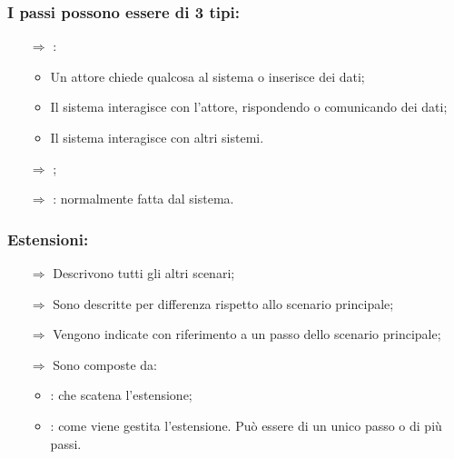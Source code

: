 \subsubsection{I passi possono essere di 3 tipi:}

\begin{itemize}
    \item [$\Rightarrow$] : 
    \begin{itemize}
        \item Un attore chiede qualcosa al sistema o inserisce dei dati;
        \item Il sistema interagisce con l'attore, rispondendo o comunicando dei dati;
        \item Il sistema interagisce con altri sistemi.
    \end{itemize}
    \item [$\Rightarrow$] ;
    \item [$\Rightarrow$] : normalmente fatta dal sistema.
\end{itemize}


\subsubsection{Estensioni:}

\begin{itemize}
    \item [$\Rightarrow$] Descrivono tutti gli altri scenari;
    \item [$\Rightarrow$] Sono descritte per differenza rispetto allo scenario principale;
    \item [$\Rightarrow$] Vengono indicate con riferimento a un passo dello scenario principale;
    \item [$\Rightarrow$] Sono composte da:
    \begin{itemize}
        \item {}: che scatena l'estensione;
        \item {}: come viene gestita l'estensione. Può essere di un unico passo o di più passi.
    \end{itemize}
\end{itemize}


